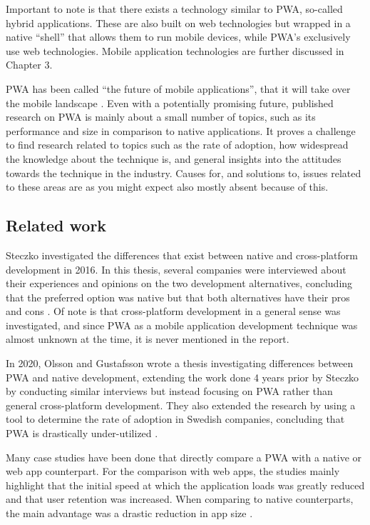 \documentclass[a4paper,12pt]{article}
\begin{document}
Important to note is that there exists a technology similar to PWA, so-called hybrid applications. These are also built on web technologies but wrapped in a native “shell” that allows them to run mobile devices, while PWA’s exclusively use web technologies. Mobile application technologies are further discussed in Chapter 3. 

PWA has been called “the future of mobile applications”, that it will take over the mobile landscape \cite{casestudies_mia, futureofweb_claim1}. Even with a potentially promising future, published research on PWA is mainly about a small number of topics, such as its performance and size in comparison to native applications. It proves a challenge to find research related to topics such as the rate of adoption, how widespread the knowledge about the technique is, and general insights into the attitudes towards the technique in the industry. Causes for, and solutions to, issues related to these areas are as you might expect also mostly absent because of this.

\subsection{Related work}
Steczko investigated the differences that exist between native and cross-platform development in 2016. In this thesis, several companies were interviewed about their experiences and opinions on the two development alternatives, concluding that the preferred option was native but that both alternatives have their pros and cons \cite{thesis_steczko}. Of note is that cross-platform development in a general sense was investigated, and since PWA as a mobile application development technique was almost unknown at the time, it is never mentioned in the report.

In 2020, Olsson and Gustafsson wrote a thesis investigating differences between PWA and native development, extending the work done 4 years prior by Steczko by conducting similar interviews but instead focusing on PWA rather than general cross-platform development. They also extended the research by using a tool to determine the rate of adoption in Swedish companies, concluding that PWA is drastically under-utilized \cite{thesis_sverige}.

Many case studies have been done that directly compare a PWA with a native or web app counterpart. For the comparison with web apps, the studies mainly highlight that the initial speed at which the application loads was greatly reduced and that user retention was increased. When comparing to native counterparts, the main advantage was a drastic reduction in app size \cite{casestudies_mia, thesis_pwa_2017, casestudies_google_1, casestudies_google_2, realize_native_with_pwa}.
\end{document}

